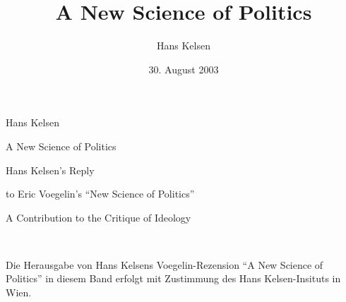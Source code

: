 \documentclass[15pt,a4paper,ngerman]{ontosbook}
\begin{document}
\fontsize{15}{16.5}
\selectfont

\selectlanguage{\ngerman}

\title{A New Science of Politics}
\author{Hans Kelsen}

\date{30. August 2003}


\begin{titlepage}

\setlength{\parindent}{0em}


\begin{sf}

\setlength{\parskip}{5cm}

{\Huge Hans Kelsen}

\setlength{\parskip}{0.5cm}

{\Huge A New Science of Politics}

\setlength{\parskip}{14cm}

{\Large Hans Kelsen's Reply}

\setlength{\parskip}{0.2cm}

{\Large to Eric Voegelin's "`New Science of Politics"'}

\setlength{\parskip}{0.2cm}

{\Large A Contribution to the Critique of Ideology}

\setlength{\parskip}{5cm}

\end{sf}

\end{titlepage}

\pagestyle{empty}



\ ~

\setlength{\parskip}{18cm}

Die Herausgabe von Hans Kelsens Voegelin-Rezension "`A New Science of
Politics"' in diesem Band erfolgt mit Zustimmung des Hans
Kelsen-Insituts in Wien.

\setlength{\parskip}{0cm}


\tableofcontents

\thispagestyle{empty}

\newpage

\ ~

\newpage

\pagestyle{myheadings}

\setcounter{page}{7}




\end{document}
